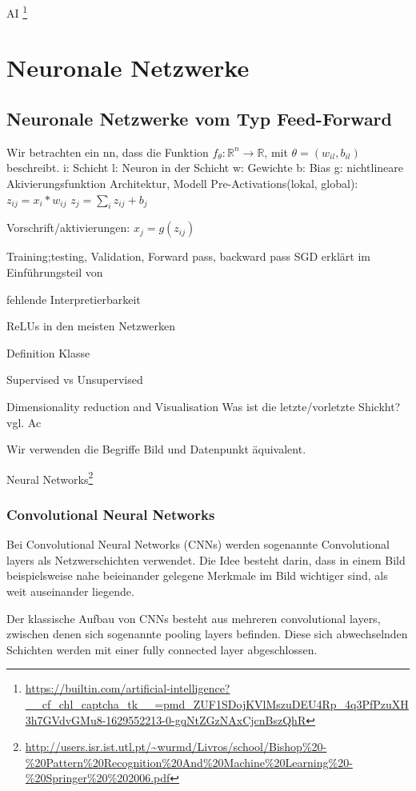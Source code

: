 \documentclass[11pt,a4paper]{article}
\numberwithin{equation}{section}
\begin{document}
	AI \footnote{\url{https://builtin.com/artificial-intelligence?__cf_chl_captcha_tk__=pmd_ZUF1SDojKVlMszuDEU4Rp_4q3PfPzuXH3h7GVdvGMu8-1629552213-0-gqNtZGzNAxCjcnBszQhR}}
	\section{Neuronale Netzwerke} \label{chapter_nn}
	
	\subsection{Neuronale Netzwerke vom Typ Feed-Forward}
	Wir betrachten ein \gls{nn}, dass die Funktion $f_{\theta}:\mathbb{R}^n \to\mathbb{R}$, mit $\theta = (w_{il}, b_{il})$ beschreibt. 
	i: Schicht
	l: Neuron in der Schicht
	w: Gewichte 
	b: Bias
	g: nichtlineare Akivierungsfunktion
	Architektur,
	Modell
	Pre-Activations(lokal, global): $z_{ij} = x_i*w_{ij}$
	$z_j = \sum_iz_{ij} + b_j$
	
	Vorschrift/aktivierungen: $x_j = g(z_{ij})$
	
	
	Training;testing, Validation, Forward pass, backward pass
	SGD erklärt im Einführungsteil von \cite{BatchNormalization}
	
	fehlende Interpretierbarkeit
	
	ReLUs in den meisten Netzwerken
	
	Definition Klasse
	
	Supervised vs Unsupervised
	
	Dimensionality reduction and Visualisation
	Was ist die letzte/vorletzte Shickht? vgl. Ac
	
	Wir verwenden die Begriffe Bild und Datenpunkt äquivalent.
	
	
	Neural Networks\footnote{\url{http://users.isr.ist.utl.pt/~wurmd/Livros/school/Bishop\%20-\%20Pattern\%20Recognition\%20And\%20Machine\%20Learning\%20-\%20Springer\%20\%202006.pdf}}
	
	\subsubsection{Convolutional Neural Networks}
	Bei Convolutional Neural Networks (CNNs) werden sogenannte Convolutional layers als Netzwerschichten verwendet. Die Idee besteht darin, dass in einem Bild beispielsweise nahe beieinander gelegene Merkmale im Bild wichtiger sind, als weit auseinander liegende. 
	
	Der klassische Aufbau von CNNs besteht aus mehreren convolutional layers, zwischen denen sich sogenannte pooling layers befinden. Diese sich abwechselnden Schichten werden mit einer fully connected layer abgeschlossen.
	
\end{document}
